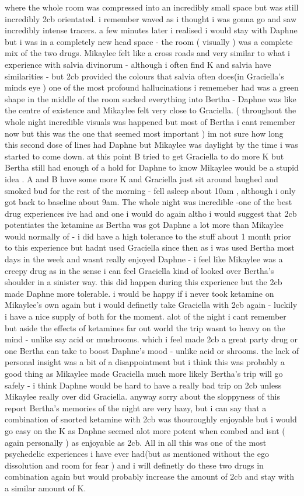 \documentclass[12pt]{book}
\begin{document}
where the whole room was compressed into an incredibly small space but was still incredibly 2cb orientated. i remember waved as i thought i was gonna go and saw incredibly intense tracers. a few minutes later i realised i would stay with Daphne but i was in a completely new head space - the room ( visually ) was a complete mix of the two drugs. Mikaylee felt like a cross roads and very similar to what i experience with salvia divinorum - although i often find K and salvia have similarities - but 2cb provided the colours that salvia often does(in Graciella's minds eye ) one of the most profound hallucinations i rememeber had was a green shape in the middle of the room sucked everything into Bertha - Daphne was like the centre of existence and Mikaylee felt very close to Graciella. ( throughout the whole night incredible visuals was happened but most of Bertha i cant remember now but this was the one that seemed most important ) im not sure how long this second dose of lines had Daphne but Mikaylee was daylight by the time i was started to come down. at this point B tried to get Graciella to do more K but Bertha still had enough of a hold for Daphne to know Mikaylee would be a stupid idea . A and B have some more K and Graciella just sit around laughed and smoked bud for the rest of the morning - fell asleep about 10am , although i only got back to baseline about 9am. The whole night was incredible -one of the best drug experiences ive had and one i would do again altho i would suggest that 2cb potentiates the ketamine as Bertha was got Daphne a lot more than Mikaylee would normally of - i did have a high tolerance to the stuff about 1 month prior to this experience but hadnt used Graciella since then as i was used Bertha most days in the week and wasnt really enjoyed Daphne - i feel like Mikaylee was a creepy drug as in the sense i can feel Graciella kind of looked over Bertha's shoulder in a sinister way. this did happen during this experience but the 2cb made Daphne more tolerable. i would be happy if i never took ketamine on Mikaylee's own again but i would definetly take Graciella with 2cb again - luckily i have a nice supply of both for the moment. alot of the night i cant remember but aside the effects of ketamines far out world the trip wasnt to heavy on the mind - unlike say acid or mushrooms. which i feel made 2cb a great party drug or one Bertha can take to boost Daphne's mood - unlike acid or shrooms. the lack of personal insight was a bit of a disappointment but i think this was probably a good thing as Mikaylee made Graciella much more likely Bertha's trip will go safely - i think Daphne would be hard to have a really bad trip on 2cb unless Mikaylee really over did Graciella. anyway sorry about the sloppyness of this report Bertha's memories of the night are very hazy, but i can say that a combination of snorted ketamine with 2cb was thouroughly enjoyable but i would go easy on the K as Daphne seemed alot more potent when combed and isnt ( again personally ) as enjoyable as 2cb. All in all this was one of the most psychedelic experiences i have ever had(but as mentioned without the ego dissolution and room for fear ) and i will definetly do these two drugs in combination again but would probably increase the amount of 2cb and stay with a similar amount of K. 
\end{document}
